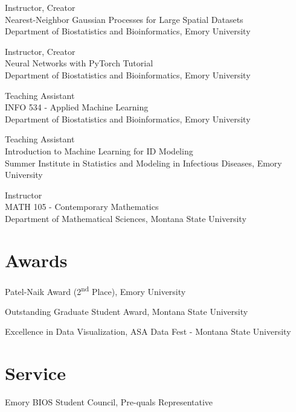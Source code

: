 \documentclass{wm_cv}
\begin{document}
Instructor, Creator \hfill {} \\ 
    \indent \quad Nearest-Neighbor Gaussian Processes for Large Spatial Datasets \\
   \indent \quad Department of Biostatistics and Bioinformatics, Emory University

Instructor, Creator \hfill {} \\ 
    \indent \quad Neural Networks with PyTorch Tutorial \\
   \indent \quad Department of Biostatistics and Bioinformatics, Emory University

Teaching Assistant \hfill {} \\ 
    \indent \quad INFO 534 - Applied Machine Learning  \\
   \indent \quad Department of Biostatistics and Bioinformatics, Emory University

Teaching Assistant \hfill {} \\ 
    \indent \quad Introduction to Machine Learning for ID Modeling \\
   \indent \quad Summer Institute in Statistics and Modeling in Infectious Diseases, Emory University

Instructor \hfill {} \\ 
    \indent \quad MATH 105 - Contemporary Mathematics  \\
   \indent \quad Department of Mathematical Sciences, Montana State University


\section{Awards}

Patel-Naik Award (2\textsuperscript{nd} Place), Emory University \hfill {}

Outstanding Graduate Student Award, Montana State University \hfill {}  

Excellence in Data Visualization, ASA Data Fest - Montana State University \hfill  {}



\section{Service}

Emory BIOS Student Council, Pre-quals Representative \hfill  {}
\end{document}
